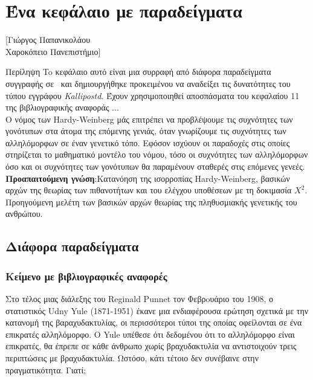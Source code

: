 \chapter{Ένα κεφάλαιο με παραδείγματα}\label{chap:sample-chapter}
\begin{refsection}
[Γιώργος Παπανικολάου \\ Χαροκόπειο Πανεπιστήμιο]
\begin{summary}{Περίληψη}
To κεφάλαιο αυτό είναι μια συρραφή από διάφορα παραδείγματα συγγραφής σε \XeLaTeX\ και δημιουργήθηκε προκειμένου να αναδείξει τις δυνατότητες του τύπου εγγράφου \emph{Kallipostd}.  Έχουν χρησιμοποιηθεί αποσπάσματα του κεφαλαίου 11 της βιβλιογραφικής αναφοράς \cite{pap}...\\
Ο νόμος των Hardy-Weinberg μάς επιτρέπει να προβλέψουμε τις συχνότητες των γονότυπων στα άτομα της επόμενης γενιάς, όταν γνωρίζουμε τις συχνότητες των αλληλόμορφων σε έναν γενετικό τόπο. Eφόσον ισχύουν οι παραδοχές στις οποίες στηρίζεται το μαθηματικό μοντέλο του νόμου, τόσο οι συχνότητες των αλληλόμορφων όσο και οι συχνότητες των γονότυπων θα παραμένουν σταθερές στις επόμενες γενεές. \\
\textbf{Προαπαιτούμενη γνώση}:Κατανόηση της ισορροπίας Hardy-Weinberg, βασικών αρχών της θεωρίας των πιθανοτήτων και του ελέγχου υποθέσεων με τη δοκιμασία $X^2$. Προηγούμενη μελέτη των βασικών αρχών θεωρίας της πληθυσμιακής γενετικής του ανθρώπου.
\end{summary}

\section{Διάφορα παραδείγματα}
\label{sec:exapmples}
\subsection{Κείμενο με βιβλιογραφικές αναφορές}
\label{subsec:text-ref}
Στο τέλος μιας διάλεξης του Reginald Punnet τον Φεβρoυάριο του 1908, ο στατιστικός Udny Yule
(1871-1951) έκανε μια ενδιαφέρουσα ερώτηση σχετικά με την κατανομή της βαραχυδακτυλίας, οι
περισσότεροι τύποι της οποίας οφείλονται σε ένα επικρατές αλληλόμορφο. Ο Yule υπέθεσε ότι
δεδομένου ότι το αλληλόμορφο είναι επικρατές, θα έπρεπε σε κάθε άνθρωπο χωρίς βραχυδακτυλία να
αντιστοιχούν τρεις περιπτώσεις με βραχυδακτυλία. Ωστόσο, κάτι τέτοιο δεν συνέβαινε στην
πραγματικότητα. Γιατί;


\end{refsection}
